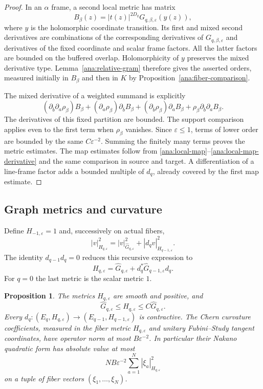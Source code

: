 \documentclass[11pt,reqno]{amsart}
\numberwithin{equation}{section}
\newtheorem{proposition}[theorem]{Proposition}
\theoremstyle{definition}
\theoremstyle{remark}
\begin{document}
\begin{proof}
In an $\alpha$ frame, a second local metric has matrix
\[
 B_\beta(z)=|t(z)|^{2D_q}
 G_{q,\beta,\varepsilon}(y(z)),
\]
where $y$ is the holomorphic coordinate transition.  Its first and
mixed second derivatives are combinations of the corresponding
derivatives of $G_{q,\beta,\varepsilon}$ and derivatives of the
fixed coordinate and scalar frame factors.  All the latter factors
are bounded on the buffered overlap.  Holomorphicity of $y$ preserves
the mixed derivative type.  Lemma~\ref{ana:relative-gram} therefore
gives the asserted orders, measured initially in $B_\beta$ and then
in $K$ by Proposition~\ref{ana:fiber-comparison}.

The mixed derivative of a weighted summand is explicitly
\[
 (\partial_{\bar b}\partial_a\rho_\beta)B_\beta
 +(\partial_a\rho_\beta)\partial_{\bar b}B_\beta
 +(\partial_{\bar b}\rho_\beta)\partial_aB_\beta
 +\rho_\beta\partial_{\bar b}\partial_aB_\beta.
\]
The derivatives of this fixed partition are bounded.  The support
comparison applies even to the first term when $\rho_\beta$ vanishes.
Since $\varepsilon\leq1$, terms of lower order are bounded by the
same $C\varepsilon^{-2}$.  Summing the finitely many terms proves
the metric estimates.  The map estimates follow from
\eqref{ana:local-map}--\eqref{ana:local-map-derivative} and the same
comparison in source and target.  A differentiation of a line-frame
factor adds a bounded multiple of $d_q$, already covered by the first
map estimate.
\end{proof}

\subsection{Graph metrics and curvature}

Define $H_{-1,\varepsilon}=1$ and, successively on actual fibers,
\begin{equation}\label{ana:graph-definition}
 |v|_{H_{q,\varepsilon}}^2
 =|v|_{\widehat G_{q,\varepsilon}}^2
  +|d_qv|_{H_{q-1,\varepsilon}}^2.
\end{equation}
The identity $d_{q-1}d_q=0$ reduces this recursive expression to
\begin{equation}\label{ana:graph-matrix}
 H_{q,\varepsilon}
 =\widehat G_{q,\varepsilon}
   +d_q^*\widehat G_{q-1,\varepsilon}d_q.
\end{equation}
For $q=0$ the last metric is the scalar metric $1$.

\begin{proposition}\label{ana:graph-curvature}
The metrics $H_{q,\varepsilon}$ are smooth and positive, and
\[
 \widehat G_{q,\varepsilon}\leq H_{q,\varepsilon}
 \leq C\widehat G_{q,\varepsilon}.
\]
Every $d_q:(E_q,H_{q,\varepsilon})\to
(E_{q-1},H_{q-1,\varepsilon})$ is contractive.  The Chern curvature
coefficients, measured in the fiber metric $H_{q,\varepsilon}$ and
unitary Fubini--Study tangent coordinates, have operator norm at most
$B\varepsilon^{-2}$.  In particular their Nakano quadratic form has
absolute value at most
\[
 NB\varepsilon^{-2}\sum_{a=1}^N|\xi_a|_{H_{q,\varepsilon}}^2
\]
on a tuple of fiber vectors $(\xi_1,\ldots,\xi_N)$.
\end{proposition}
\end{document}
